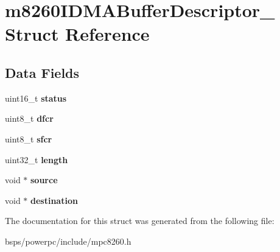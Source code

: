\hypertarget{structm8260IDMABufferDescriptor__}{}\section{m8260\+I\+D\+M\+A\+Buffer\+Descriptor\+\_\+ Struct Reference}
\label{structm8260IDMABufferDescriptor__}
\subsection*{Data Fields}
\begin{DoxyCompactItemize}
\item 
\mbox{\label{structm8260IDMABufferDescriptor___a3a5a1ebb6c2d46019906aaf426a655b3}} 
uint16\+\_\+t {\bfseries status}
\item 
\mbox{\label{structm8260IDMABufferDescriptor___ac3689578758baa065e3fcb2fd135e575}} 
uint8\+\_\+t {\bfseries dfcr}
\item 
\mbox{\label{structm8260IDMABufferDescriptor___ab2184a0f3337ea5cc61841f5ec879fd1}} 
uint8\+\_\+t {\bfseries sfcr}
\item 
\mbox{\label{structm8260IDMABufferDescriptor___a9b3291f45d6b39080aa223e954c65eee}} 
uint32\+\_\+t {\bfseries length}
\item 
\mbox{\label{structm8260IDMABufferDescriptor___a96ebb12f6da0bb9afbbae7d6fbd97210}} 
void $\ast$ {\bfseries source}
\item 
\mbox{\label{structm8260IDMABufferDescriptor___a90e1c8bbab14dff41421d2a5ff32039d}} 
void $\ast$ {\bfseries destination}
\end{DoxyCompactItemize}


The documentation for this struct was generated from the following file\+:\begin{DoxyCompactItemize}
\item 
bsps/powerpc/include/mpc8260.\+h\end{DoxyCompactItemize}
